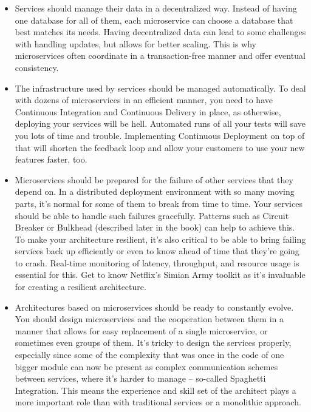 \begin{itemize}
\item
Services should manage their data in a decentralized way. Instead of having one database for all of them, each microservice can choose a database that best matches its needs. Having decentralized data can lead to some challenges with handling updates, but allows for better scaling. This is why microservices often coordinate in a transaction-free manner and offer eventual consistency.


\item
The infrastructure used by services should be managed automatically. To deal with dozens of microservices in an efficient manner, you need to have Continuous Integration and Continuous Delivery in place, as otherwise, deploying your services will be hell. Automated runs of all your tests will save you lots of time and trouble. Implementing Continuous Deployment on top of that will shorten the feedback loop and allow your customers to use your new features faster, too.

\item
Microservices should be prepared for the failure of other services that they depend on. In a distributed deployment environment with so many moving parts, it's normal for some of them to break from time to time. Your services should be able to handle such failures gracefully. Patterns such as Circuit Breaker or Bulkhead (described later in the book) can help to achieve this. To make your architecture resilient, it's also critical to be able to bring failing services back up efficiently or even to know ahead of time that they're going to crash. Real-time monitoring of latency, throughput, and resource usage is essential for this. Get to know Netflix's Simian Army toolkit as it's invaluable for creating a resilient architecture.

\item
Architectures based on microservices should be ready to constantly evolve. You should design microservices and the cooperation between them in a manner that allows for easy replacement of a single microservice, or sometimes even groups of them. It's tricky to design the services properly, especially since some of the complexity that was once in the code of one bigger module can now be present as complex communication schemes between services, where it's harder to manage – so-called Spaghetti Integration. This means the experience and skill set of the architect plays a more important role than with traditional services or a monolithic approach.


\end{itemize}

